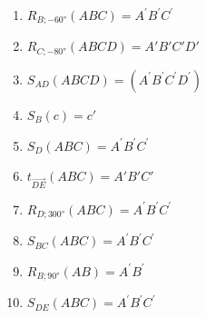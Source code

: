 \begin{solution}
  \renewcommand{\figcolor}{Green}
  \begin{enumerate}
    \item $R_{B; \ang{-60}}\left( ABC \right) = A^{'}B^{'}C^{'}$
          \begin{center}
            
          \end{center}
    \item $R_{C; \ang{-80}}\left( ABCD \right) = A'B'C'D'$
          \begin{center}
            
          \end{center}
    \item $S_{AD}(ABCD) = (A^{'}B^{'}C^{'}D^{'})$
          \begin{center}
            
          \end{center}
          \newpage
    \item $S_{B}(c) = c'$
          \begin{center}
            
          \end{center}
    \item $S_{D}\left( ABC \right) = A^{'}B^{'}C^{'}$
          \begin{center}
            
          \end{center}
    \item $t_{\overrightarrow{DE}}\left( ABC \right) = A'B'C'$
          \begin{center}
            
          \end{center}
          \newpage
    \item $R_{D;\ang{300}}\left( ABC \right) = A^{'}B^{'}C^{'}$
          \begin{center}
            
          \end{center}
    \item $S_{BC}\left( ABC \right) = A^{'}B^{'}C^{'}$
          \begin{center}
            
          \end{center}
    \item $R_{B;\ang{90}}\left( AB \right) = A^{'}B^{'}$
          \begin{center}
            
          \end{center}
          \newpage
    \item $S_{DE}\left( ABC \right) = A^{'}B^{'}C^{'}$

\end{enumerate}
\end{solution}
